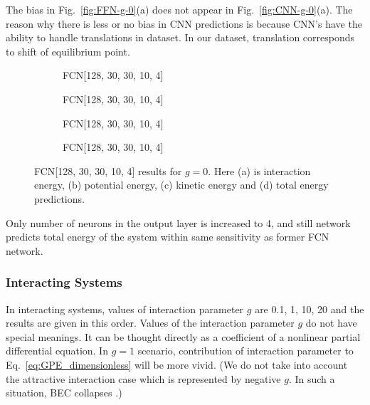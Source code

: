 \documentclass[a4paper,times,12pt]{article}
\begin{document}
The bias in Fig.~\ref{fig:FFN-g-0}(a) does not appear in Fig.~\ref{fig:CNN-g-0}(a). The reason why there is less or no bias in CNN predictions is because CNN's have the ability to handle translations in dataset. In our dataset, translation corresponds to shift of equilibrium point. 

\begin{figure}[H]
    \centering
    \begin{subfigure}[t]{0.45\textwidth}
		\centering
        
        \caption{FCN[128, 30, 30, 10, 4]}
		\label{fig:a}
    \end{subfigure}
    \begin{subfigure}[t]{0.45\textwidth}
		\centering
        
        \caption{FCN[128, 30, 30, 10, 4]}
		\label{fig:b}
    \end{subfigure}    
    \begin{subfigure}[t]{0.45\textwidth}
        \centering
        
        \caption{FCN[128, 30, 30, 10, 4]}
		\label{fig:c}
    \end{subfigure}
    \begin{subfigure}[t]{0.45\textwidth}
        \centering
        
        \caption{FCN[128, 30, 30, 10, 4]}
		\label{fig:c}
    \end{subfigure}
	\caption{FCN[128, 30, 30, 10, 4] results for $g = 0$. Here (a) is interaction energy, (b) potential energy, (c) kinetic energy and (d) total energy predictions.}
\label{fig:FFN-g-0-S}
\end{figure}

Only number of neurons in the output layer is increased to 4, and still network predicts total energy of the system within same sensitivity as former FCN network.


\subsubsection{Interacting Systems}

In interacting systems, values of interaction parameter $g$ are 0.1, 1, 10, 20 and the results are given in this order. Values of the interaction parameter $g$ do not have special meanings. It can be thought directly as a coefficient of a nonlinear partial differential equation. In $g =1$ scenario, contribution of interaction parameter to Eq.~\ref{eq:GPE_dimensionless} will be more vivid. (We do not take into account the attractive interaction case which is represented by negative $g$. In such a situation, BEC collapses \cite{barenghi2016primer}.)
\end{document}
